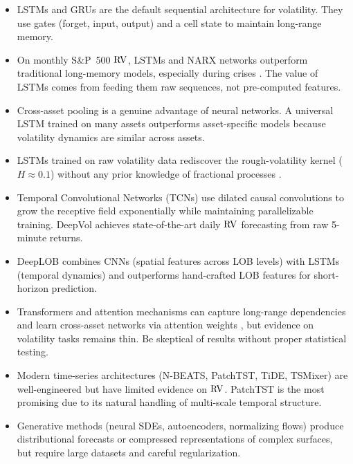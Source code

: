 \begin{itemize}
  \item LSTMs and GRUs are the default sequential architecture for volatility.
    They use gates (forget, input, output) and a cell state to maintain long-range memory.

  \item On monthly S\&P~500 $\operatorname{RV}$, LSTMs and NARX networks outperform traditional long-memory models, especially during crises \citep{Bucci2020}.
    The value of LSTMs comes from feeding them raw sequences, not pre-computed features.

  \item Cross-asset pooling is a genuine advantage of neural networks.
    A universal LSTM trained on many assets outperforms asset-specific models \citep{SirignanoCont2019} because volatility dynamics are similar across assets.

  \item LSTMs trained on raw volatility data rediscover the rough-volatility kernel ($H \approx 0.1$) without any prior knowledge of fractional processes \citep{RosenbaumZhang2022}.

  \item Temporal Convolutional Networks (TCNs) use dilated causal convolutions to grow the receptive field exponentially while maintaining parallelizable training.
    DeepVol \citep{MorenoPinoZohren2022DeepVol} achieves state-of-the-art daily $\operatorname{RV}$ forecasting from raw 5-minute returns.

  \item DeepLOB \citep{ZhangZohrenRoberts2019DeepLOB} combines CNNs (spatial features across LOB levels) with LSTMs (temporal dynamics) and outperforms hand-crafted LOB features for short-horizon prediction.

  \item Transformers and attention mechanisms can capture long-range dependencies and learn cross-asset networks via attention weights \citep{ChenRobert2022}, but evidence on volatility tasks remains thin. Be skeptical of results without proper statistical testing.

  \item Modern time-series architectures (N-BEATS, PatchTST, TiDE, TSMixer) are well-engineered but have limited evidence on $\operatorname{RV}$. PatchTST is the most promising due to its natural handling of multi-scale temporal structure.

  \item Generative methods (neural SDEs, autoencoders, normalizing flows) produce distributional forecasts or compressed representations of complex surfaces, but require large datasets and careful regularization.


\end{itemize}
